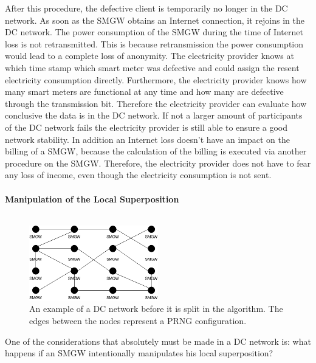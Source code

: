 After this procedure, the defective client is temporarily no longer in the DC network. As soon as the SMGW obtains an Internet connection, it rejoins in the DC network. The power consumption of the SMGW during the time of Internet loss is not retransmitted. This is because retransmission the power consumption would lead to a complete loss of anonymity. The electricity provider knows at which time stamp which smart meter was defective and could assign the resent electricity consumption directly. Furthermore, the electricity provider knows how many smart meters are functional at any time and how many are defective through the transmission bit. Therefore the electricity provider can evaluate how conclusive the data is in the DC network. %
If not a larger amount of participants of the DC network fails the electricity provider is still able to ensure a good network stability. %
In addition an Internet loss doesn't have an impact on the billing of a SMGW, because the calculation of the billing is executed via another procedure on the SMGW. Therefore, the electricity provider does not have to fear any loss of income, even though the electricity consumption is not sent.\\
\\ 
\textbf{Manipulation of the Local Superposition}
\\
\\
\begin{figure}[tbp]
  \centering
  \includegraphics[width=0.5\textwidth]{images/DC Net before Split.png}
  \caption[Example DC Network]{An example of a DC network before it is split in the algorithm. The edges between the nodes represent a PRNG configuration.}
  \label{fig:splitDCNetwork}
\end{figure}
One of the considerations that absolutely must be made in a DC network is: what happens if an SMGW intentionally manipulates his local superposition?
